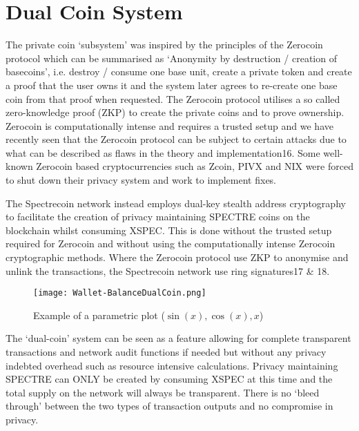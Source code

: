 \section{Dual Coin System}
The private coin ‘subsystem’ was inspired by the principles of the Zerocoin
protocol which can be summarised as ‘Anonymity by destruction / creation of
basecoins’, i.e. destroy / consume one base unit, create a private token
and create a proof that the user owns it and the system later agrees to
re-create one base coin from that proof when requested. The Zerocoin protocol
utilises a so called zero-knowledge proof (ZKP) to create the private coins
and to prove ownership. Zerocoin is computationally intense and requires a
trusted setup and we have recently seen that the Zerocoin protocol can be
subject to certain attacks due to what can be described as flaws in the
theory and implementation16. Some well-known Zerocoin based cryptocurrencies
such as Zcoin, PIVX and NIX were forced to shut down their privacy system and
work to implement fixes.



The Spectrecoin network instead employs dual-key stealth address cryptography
to facilitate the creation of privacy maintaining SPECTRE coins on the
blockchain whilst consuming XSPEC. This is done without the trusted setup
required for Zerocoin and without using the computationally intense Zerocoin
cryptographic methods. Where the Zerocoin protocol use ZKP to anonymise and
unlink the transactions, the Spectrecoin network use ring signatures17 \& 18.



\begin{figure}[h]
	\caption{Example of a parametric plot ($\sin (x), \cos(x), x$)}
	\centering
	\texttt{[image: Wallet-BalanceDualCoin.png]}
\end{figure}



The ‘dual-coin’ system can be seen as a feature allowing for complete
transparent transactions and network audit functions if needed but
without any privacy indebted overhead such as resource intensive
calculations. Privacy maintaining SPECTRE can ONLY be created by
consuming XSPEC at this time and the total supply on the network
will always be transparent. There is no ‘bleed through’ between the
two types of transaction outputs and no compromise in privacy.
